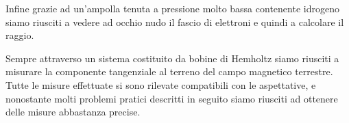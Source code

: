 \documentclass[a4paper,11pt]{article}
\begin{document}
	Infine grazie ad un'ampolla tenuta a pressione molto bassa contenente idrogeno siamo riusciti a vedere ad occhio nudo il fascio di elettroni e quindi a calcolare il raggio. 
	
	Sempre attraverso un sistema costituito da bobine di Hemholtz siamo riusciti a misurare la componente tangenziale al terreno del campo magnetico terrestre. Tutte le misure effettuate si sono rilevate compatibili con le aspettative, e nonostante molti problemi pratici descritti in seguito siamo riusciti ad ottenere delle misure abbastanza precise.
	
	
	
	
\end{document}

